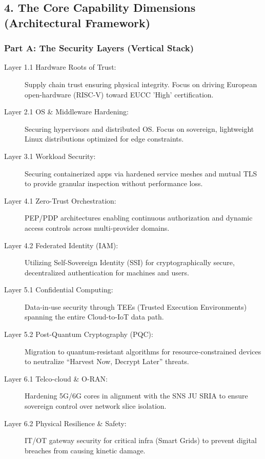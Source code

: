 \documentclass{ieeeaccess}
\begin{document}
\subsection{4. The Core Capability Dimensions (Architectural Framework)}

\subsubsection{Part A: The Security Layers (Vertical Stack)}
\begin{description}
    \item[Layer 1.1 Hardware Roots of Trust:] Supply chain trust ensuring physical integrity. Focus on driving European open-hardware (RISC-V) toward EUCC 'High' certification.
    \item[Layer 2.1 OS \& Middleware Hardening:] Securing hypervisors and distributed OS. Focus on sovereign, lightweight Linux distributions optimized for edge constraints.
    \item[Layer 3.1 Workload Security:] Securing containerized apps via hardened service meshes and mutual TLS to provide granular inspection without performance loss.
    \item[Layer 4.1 Zero-Trust Orchestration:] PEP/PDP architectures enabling continuous authorization and dynamic access controls across multi-provider domains.
    \item[Layer 4.2 Federated Identity (IAM):] Utilizing Self-Sovereign Identity (SSI) for cryptographically secure, decentralized authentication for machines and users.
    \item[Layer 5.1 Confidential Computing:] Data-in-use security through TEEs (Trusted Execution Environments) spanning the entire Cloud-to-IoT data path.
    \item[Layer 5.2 Post-Quantum Cryptography (PQC):] Migration to quantum-resistant algorithms for resource-constrained devices to neutralize ``Harvest Now, Decrypt Later''  threats.
    \item[Layer 6.1 Telco-cloud \& O-RAN:] Hardening 5G/6G cores in alignment with the SNS JU SRIA to ensure sovereign control over network slice isolation.
    \item[Layer 6.2 Physical Resilience \& Safety:] IT/OT gateway security for critical infra (Smart Grids) to prevent digital breaches from causing kinetic damage.
\end{description}
\end{document}
